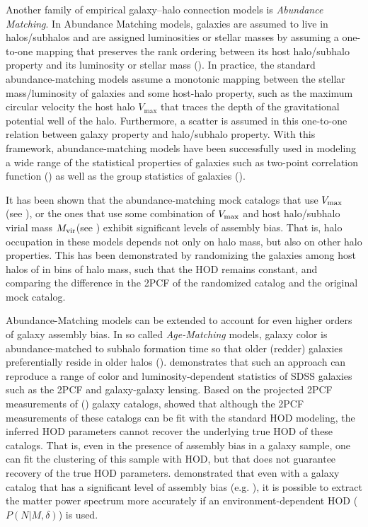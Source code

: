 \documentclass[12pt, preprint]{aastex}
\begin{document}
Another family of empirical galaxy--halo connection models is \emph{Abundance} \emph{Matching}. In Abundance Matching models, galaxies are assumed to live in halos/subhalos and are assigned luminosities or stellar masses by assuming a one-to-one mapping that preserves the rank ordering between its host halo/subhalo property and its luminosity or stellar mass
(\citealt{kravtsov2004,vale2004,tasitsiomi2004,conroy2009,guo2010,wetzel2010,Neisten2011,watson2012,rodriguez2012,kravstov2013,mao2015,chavez2016}). 
In practice, the standard abundance-matching models assume a monotonic mapping between the stellar mass/luminosity of galaxies and some host-halo property, such as 
the maximum circular velocity the host halo $V_\mathrm{max}$ that traces the depth of the gravitational potential well of the halo. Furthermore, a scatter is assumed in this one-to-one relation between galaxy property and halo/subhalo property. With this framework, abundance-matching models have been successfully used in modeling a wide range of the 
statistical properties of galaxies such as two-point correlation function (\citealt{reddick2013,lehman2015,hod_vs_sham}) as well as the group statistics of galaxies (\citealt{sham_gmf}). 

It has been shown that the abundance-matching mock catalogs that use $V_{\rm max}$ (see \citealt{hw2013,arz2014}), or the ones that use some combination of $V_{\rm max}$ and host halo/subhalo virial mass $M_{\rm vir} $(see \citealt{lehman2015}) exhibit significant levels of assembly bias. That is, halo occupation in these models depends not only on halo mass, but also on other halo properties. This has been demonstrated by randomizing the galaxies among host halos of in bins of halo mass, such that the HOD remains constant, and comparing the difference in the 2PCF of the randomized catalog and the original mock catalog.  

Abundance-Matching models can be extended to account for even higher orders of galaxy 
assembly bias. In so called \emph{Age-Matching} models, galaxy color is abundance-matched
to subhalo formation time so that older (redder) galaxies preferentially reside in older halos (\citealt{hw2013}). \citet{hearin2014} demonstrates that such an approach can reproduce a range of color and luminosity-dependent statistics of SDSS galaxies such as the 2PCF and galaxy-galaxy lensing. Based on the projected 2PCF measurements of (\citealt{hw2013}) galaxy catalogs, \citet{arz2014} showed that although the 2PCF measurements of these catalogs can be fit with the standard HOD modeling, the inferred HOD parameters cannot recover the underlying true HOD of these catalogs. That is, even in the presence of assembly bias in a galaxy sample, one can fit the clustering of this sample with HOD, but that does not guarantee recovery of the true HOD parameters. \citet{edHOD-weinberg} demonstrated that even with a galaxy catalog that has a significant level of assembly bias (e.g. \citealt{hw2013}), it is possible to extract the matter power spectrum more accurately if an environment-dependent HOD ($P(N|M,\delta)$) is used. 
\end{document}
